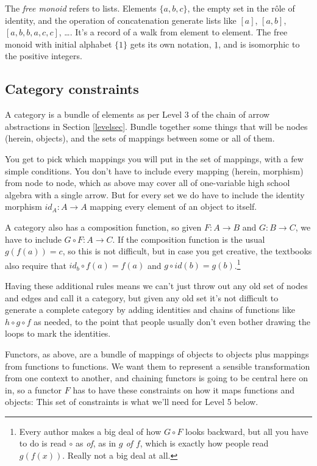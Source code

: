 \documentclass[11pt]{article}
\begin{document}
The {\em free monoid} refers to lists. Elements $\{a, b, c\}$, the empty set in the r\^ole
of identity,  and the operation
of concatenation generate lists like $[a]$, $[a,b]$, $[a,b,b,a,c,c]$, \dots. It's a
record of a walk from element to element. The free monoid with initial alphabet $\{1\}$
gets its own notation, $\underline 1$, and is isomorphic to the positive integers.

\subsection{Category constraints}
A category is a bundle of elements as per Level 3 of the chain of arrow abstractions
in Section \ref{levelsec}. Bundle together some things that will be nodes (herein,
objects), and the sets of mappings between some or all of them.

You get to pick which mappings you will put in the set of mappings, with a few simple conditions.
You don't have to include every mapping (herein, morphism) from node to node, which as above may cover all of one-variable high school algebra with a single arrow. But for every set we do have to include
the identity morphism $id_A:A\to A$ mapping every element of an object to itself.

A category also has a composition function, so given $F:A\to B$
and $G:B\to C$, we have to include $G\circ F:A\to C$. If the composition function
is the usual $g(f(a)) = c$, so this is not difficult, but in case you get
creative, the textbooks also require that $id_b\circ f(a)=f(a)$ and $g\circ id(b)
= g(b)$.\footnote{Every author makes a big deal of how $G\circ F$ looks backward,
but all you have to do is read $\circ$ as {\em of}, as in {\em $g$ of $f$}, which is
exactly how people read $g(f(x))$. Really not a big deal at all.}

Having these additional rules means we can't just throw out any old set of nodes and edges
and call it a category, but given any old set it's not difficult to generate a complete
category by adding identities and chains of functions like $h\circ g\circ f$ as needed,
to the point that people usually don't even bother drawing the loops to mark the
identities.

Functors, as above, are a bundle of mappings of objects to objects plus mappings from
functions to functions. We want them to represent a sensible transformation from one
context to another, and chaining functors is going to be central here on in, so a
functor $F$ has to have these constraints on how it maps functions and objects:
This set of constraints is what we'll need for Level 5 below.
\end{document}
